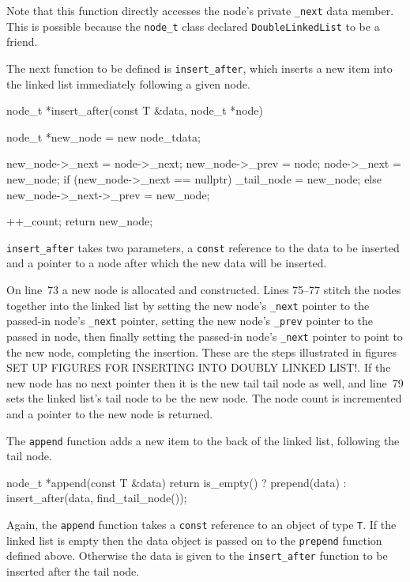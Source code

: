 \documentclass{article}
\begin{document}
  Note that this function directly accesses the node's private \verb|_next| data member. This is possible because the \verb|node_t| class declared \verb|DoubleLinkedList| to be a friend.

  The next function to be defined is \verb|insert_after|, which inserts a new item into the linked list immediately following a given node.
  \begin{lstcpp}
  node_t *insert_after(const T &data, node_t *node) {
    node_t *new_node = new node_t{data};

    new_node->_next = node->_next;
    new_node->_prev = node;
    node->_next = new_node;
    if (new_node->_next == nullptr)
      _tail_node = new_node;
    else
      new_node->_next->_prev = new_node;

    ++_count;
    return new_node;
  }\end{lstcpp}
  \verb|insert_after| takes two parameters, a \verb|const| reference to the data to be inserted and a pointer to a node after which the new data will be inserted.

  On line~73 a new node is allocated and constructed. Lines 75--77 stitch the nodes together into the linked list by setting the new node's \verb|_next| pointer to the passed-in node's \verb|_next| pointer, setting the new node's \verb|_prev| pointer to the passed in node, then finally setting the passed-in node's \verb|_next| pointer to point to the new node, completing the insertion. These are the steps illustrated in figures {SET UP FIGURES FOR INSERTING INTO DOUBLY LINKED LIST!}. If the new node has no next pointer then it is the new tail tail node as well, and line~79 sets the linked list's tail node to be the new node. The node count is incremented and a pointer to the new node is returned.

  The \verb|append| function adds a new item to the back of the linked list, following the tail node.
  \begin{lstcpp}
  node_t *append(const T &data) {
    return is_empty() ? prepend(data)
                      : insert_after(data, find_tail_node());
  }\end{lstcpp}
  Again, the \verb|append| function takes a \verb|const| reference to an object of type \verb|T|. If the linked list is empty then the data object is passed on to the \verb|prepend| function defined above. Otherwise the data is given to the \verb|insert_after| function to be inserted after the tail node.
\end{document}
